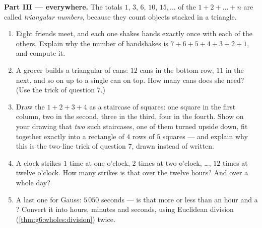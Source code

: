\begin{problem}
\medskip
\noindent\textbf{Part III ---  everywhere.}
The totals $1$, $3$, $6$, $10$, $15, \dots$ of the 
$1 + 2 + \dots + n$ are called \emph{triangular
numbers}, because they count objects
stacked in a triangle.
\begin{enumerate}[resume]
  \item Eight friends meet, and each one shakes hands exactly once
        with each of the others. Explain why the number of
        handshakes is $7 + 6 + 5 + 4 + 3 + 2 + 1$, and compute it.
  \item A grocer builds a triangular  of cans: $12$ cans in
        the bottom row, $11$ in the next, and so on up to a single
        can on top. How many cans does she need? (Use the trick of
        question 7.)
  \item Draw the  $1 + 2 + 3 + 4$ as a staircase of squares:
        one square in the first column, two in the second, three
        in the third, four in the fourth. Show on your drawing
        that \emph{two} such staircases, one of them turned upside
        down, fit together exactly into a rectangle of $4$ rows of
        $5$ squares --- and explain why this is the two-line trick
        of question 7, drawn instead of written.
  \item A clock strikes $1$ time at one o'clock, $2$ times at two
        o'clock, \dots, $12$ times at twelve o'clock. How many
        strikes is that over the twelve hours? And over a whole
        day?
  \item A last one for Gauss: $5\,050$ seconds --- is that more or
        less than an hour and a ? Convert it into hours,
        minutes and seconds, using Euclidean division
        (\cref{thm:g6:wholes:division}) twice.
\end{enumerate}
\end{problem}
